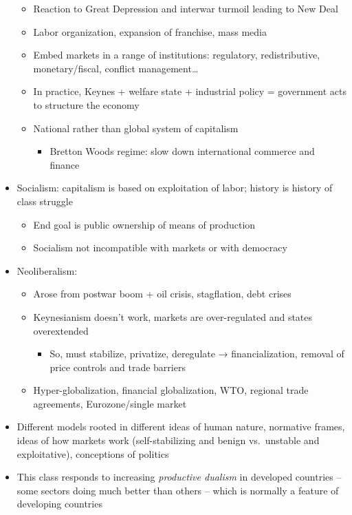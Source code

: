 \begin{itemize}
  \begin{itemize}
  \tightlist
  \item
    Reaction to Great Depression and interwar turmoil leading to New
    Deal
  \item
    Labor organization, expansion of franchise, mass media
  \item
    Embed markets in a range of institutions: regulatory,
    redistributive, monetary/fiscal, conflict management\ldots{}
  \item
    In practice, Keynes + welfare state + industrial policy = government
    acts to structure the economy
  \item
    National rather than global system of capitalism

    \begin{itemize}
    \tightlist
    \item
      Bretton Woods regime: slow down international commerce and finance
    \end{itemize}
  \end{itemize}
\item
  Socialism: capitalism is based on exploitation of labor; history is
  history of class struggle

  \begin{itemize}
  \tightlist
  \item
    End goal is public ownership of means of production
  \item
    Socialism not incompatible with markets or with democracy
  \end{itemize}
\item
  Neoliberalism:

  \begin{itemize}
  \tightlist
  \item
    Arose from postwar boom + oil crisis, stagflation, debt crises
  \item
    Keynesianism doesn't work, markets are over-regulated and states
    overextended

    \begin{itemize}
    \tightlist
    \item
      So, must stabilize, privatize, deregulate → financialization,
      removal of price controls and trade barriers
    \end{itemize}
  \item
    Hyper-globalization, financial globalization, WTO, regional trade
    agreements, Eurozone/single market
  \end{itemize}
\item
  Different models rooted in different ideas of human nature, normative
  frames, ideas of how markets work (self-stabilizing and benign
  vs.~unstable and exploitative), conceptions of politics
\item
  This class responds to increasing \emph{productive dualism} in
  developed countries -- some sectors doing much better than others --
  which is normally a feature of developing countries


\end{itemize}
